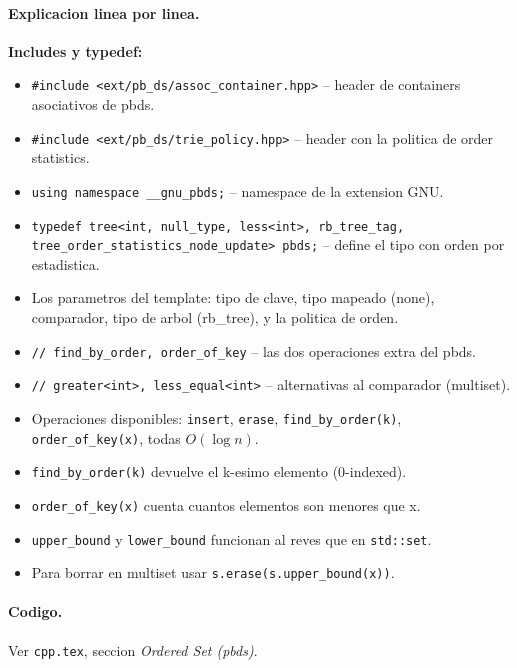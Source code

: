 \paragraph{Explicacion linea por linea.}
\textbf{Includes y typedef:}
\begin{itemize}\setlength\itemsep{0pt}
	\item \texttt{\#include <ext/pb\_ds/assoc\_container.hpp>} -- header de containers asociativos de pbds.
	\item \texttt{\#include <ext/pb\_ds/trie\_policy.hpp>} -- header con la politica de order statistics.
	\item \texttt{using namespace \_\_gnu\_pbds;} -- namespace de la extension GNU.
	\item \texttt{typedef tree<int, null\_type, less<int>, rb\_tree\_tag, tree\_order\_statistics\_node\_update> pbds;} -- define el tipo con orden por estadistica.
	\item Los parametros del template: tipo de clave, tipo mapeado (none), comparador, tipo de arbol (rb\_tree), y la politica de orden.
	\item \texttt{// find\_by\_order, order\_of\_key} -- las dos operaciones extra del pbds.
	\item \texttt{// greater<int>, less\_equal<int>} -- alternativas al comparador (multiset).
	\item Operaciones disponibles: \texttt{insert}, \texttt{erase}, \texttt{find\_by\_order(k)}, \texttt{order\_of\_key(x)}, todas $O(\log n)$.
	\item \texttt{find\_by\_order(k)} devuelve el k-esimo elemento (0-indexed).
	\item \texttt{order\_of\_key(x)} cuenta cuantos elementos son menores que x.
	\item \texttt{upper\_bound} y \texttt{lower\_bound} funcionan al reves que en \texttt{std::set}.
	\item Para borrar en multiset usar \texttt{s.erase(s.upper\_bound(x))}.
\end{itemize}

\paragraph{Codigo.}
Ver \texttt{cpp.tex}, seccion \textit{Ordered Set (pbds)}.

\vspace{0.5em}